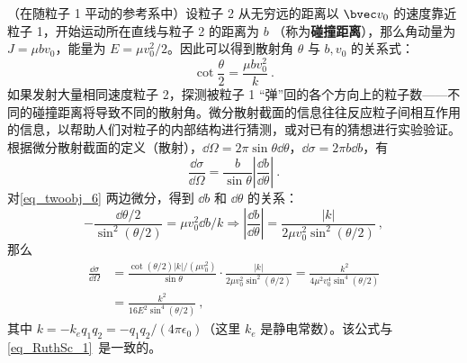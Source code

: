 （在随粒子 1 平动的参考系中）设粒子 2 从无穷远的距离以 $\bvec v_0$ 的速度靠近粒子 1，开始运动所在直线与粒子 2 的距离为 $b$ （称为\textbf{碰撞距离}），那么角动量为 $J=\mu bv_0$，能量为 $E=\mu v_0^2/2$。因此可以得到散射角 $\theta$ 与 $b,v_0$ 的关系式：
\begin{equation}\label{eq_twoobj_6}
\cot \frac{\theta}{2}=\frac{\mu bv_0^2}{k}~.
\end{equation}
如果发射大量相同速度粒子 2，探测被粒子 1 “弹”回的各个方向上的粒子数——不同的碰撞距离将导致不同的散射角。微分散射截面的信息往往反应粒子间相互作用的信息，以帮助人们对粒子的内部结构进行猜测，或对已有的猜想进行实验验证。根据微分散射截面的定义（散射），$\dd \Omega=2\pi \sin\theta \dd \theta$，$\dd \sigma=2\pi b\dd b$，有
\begin{equation}
\frac{\dd \sigma}{\dd \Omega}=\frac{b}{\sin \theta}\left|\frac{\dd b}{\dd \theta}\right|~.
\end{equation}
对\autoref{eq_twoobj_6} 两边微分，得到 $\dd b$ 和 $\dd \theta$ 的关系：
\begin{equation}
-\frac{\dd \theta/2}{\sin^2(\theta/2)}=\mu v_0^2\dd b/k\Rightarrow \left|\frac{\dd b}{\dd \theta}\right|=\frac{|k|}{2\mu v_0^2\sin^2(\theta/2)}~,
\end{equation}
那么
\begin{equation}
\begin{aligned}
\frac{\dd \sigma}{\dd \Omega}&=\frac{\cot(\theta/2)|k|/(\mu v_0^2)}{\sin\theta}\cdot \frac{|k|}{2\mu v_0^2\sin^2(\theta/2)}=\frac{k^2}{4\mu ^2v_0^4\sin^4(\theta/2)}
\\
&=\frac{k^2}{16E^2\sin^4(\theta/2)}~,
\end{aligned}
\end{equation}
其中 $k=-k_eq_1q_2=-q_1q_2/(4\pi\epsilon_0)$（这里 $k_e$ 是静电常数）。该公式与\autoref{eq_RuthSc_1}~是一致的。